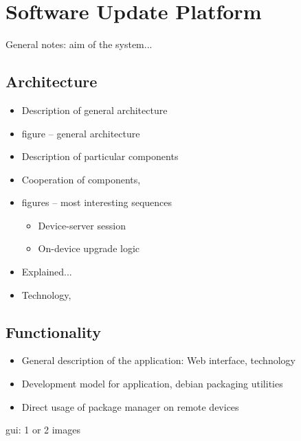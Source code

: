 \section{Software Update Platform}

General notes: aim of the system... 


\subsection{Architecture}

\begin{itemize}
	\item Description of general architecture 
	\item figure -- general architecture 
	\item Description of particular components 
	\item Cooperation of components, 
	\item figures -- most interesting sequences 
    \begin{itemize}
    \item Device-server session
    \item On-device upgrade logic
    \end{itemize} 
	\item Explained... 
	\item Technology, 
\end{itemize}


\subsection{Functionality}

\begin{itemize}
	\item General description of the application: Web interface, technology 
    \item Development model for application, debian packaging utilities
    \item Direct usage of package manager on remote devices 
\end{itemize}

gui: 1 or 2 images 

